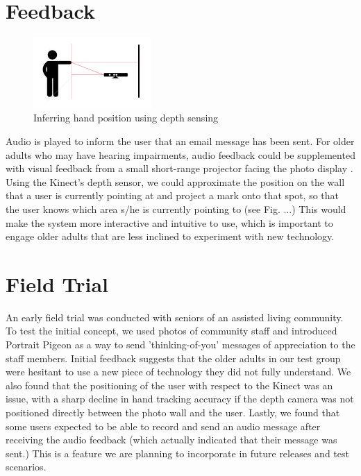 \documentclass{chi-ext}
\begin{document}
\section{Feedback}
\begin{figure}
    \centering
    \includegraphics[width=0.4\textwidth]{kinect_diag.png}
    \caption{Inferring hand position using depth sensing}
\end{figure}

Audio is played to inform the user that an email message has been sent. For older adults who may have hearing impairments, audio feedback could be supplemented with visual feedback from a small short-range projector facing the photo display \cite{Wilson2010}. Using the Kinect's depth sensor, we could approximate the position on the wall that a user is currently pointing at and project a mark onto that spot, so that the user knows which area s/he is currently pointing to (see Fig. ...) This would make the system more interactive and intuitive to use, which is important to engage older adults that are less inclined to experiment with new technology.

\section{Field Trial}
An early field trial was conducted with seniors of an assisted living community. To test the initial concept, we used photos of community staff and introduced Portrait Pigeon as a way to send 'thinking-of-you' messages of appreciation to the staff members. Initial feedback suggests that the older adults in our test group were hesitant to use a new piece of technology they did not fully understand. We also found that the positioning of the user with respect to the Kinect was an issue, with a sharp decline in hand tracking accuracy if the depth camera was not positioned directly between the photo wall and the user. Lastly, we found that some users expected to be able to record and send an audio message after receiving the audio feedback (which actually indicated that their message was sent.) This is a feature we are planning to incorporate in future releases and test scenarios.
\end{document}
